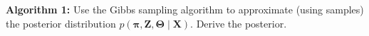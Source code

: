 \textbf{Algorithm 1:} Use the Gibbs sampling algorithm to approximate (using samples) the posterior distribution $p(\boldsymbol{\pi}, \boldsymbol{Z}, \boldsymbol{\Theta} \mid \boldsymbol{X})
$. Derive the posterior. \\\\